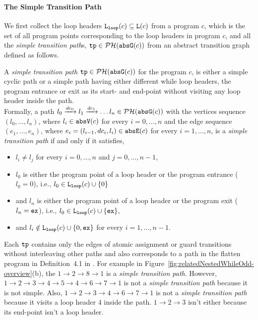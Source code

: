 \paragraph{The Simple Transition Path}
We first collect the loop headers $\mathtt{L}_{\mathtt{loop}}(c) \subseteq \mathtt{L}(c)$ from a program $c$, which is the set of all program points corresponding to the loop headers in program $c$,
and all the \emph{simple transition path}s, $\mathtt{tp} \in \mathcal{PH}(\mathtt{abs}{\mathtt{G}}(c))$ from an abstract transition graph defined as follows.
\begin{defn}
  \label{def:tpath}
A \emph{simple transition path}
$\mathtt{tp} \in \mathcal{PH}(\mathtt{abs}{\mathtt{G}}(c))$ for the program $c$, is either a simple cyclic path
or a simple path having either different while loop headers, the program entrance or exit as its start- and end-point
without visiting any loop header inside the path.
\\
Formally, a path $l_0 \xrightarrow{dc_0} l_1 \xrightarrow{dc_1} \ldots l_n \in \mathcal{PH}(\mathtt{abs}{\mathtt{G}}(c))$ with the
vertices sequence $(l_0, \ldots, l_n)$, where $l_i \in \mathtt{abs}{\mathtt{V}}(c)$ for every $i = 0, \ldots, n$ and
%
the edge sequence $(e_1, \ldots, e_n)$, where $e_i = (l_{i - 1}, dc_i, l_{i}) \in \mathtt{abs}{\mathtt{E}}(c)$ for every $i = 1, \ldots, n$,
%
is a \emph{simple transition path} if and only if it satisfies,
\begin{itemize}
  \item $l_i \neq l_j$ for every $i = 0, \ldots, n$ and $j = 0, \ldots, {n - 1}$,
  \item $l_0$ is either the program point of a loop header or the program entrance ($l_0 = 0$),
  i.e., $l_0 \in \mathtt{L}_{\mathtt{loop}}(c) \cup \{ 0 \}$
  \item and $l_n$ is either the program point of a loop header or the program exit ($l_n = \mathtt{ex}$),
  i.e., $l_0 \in \mathtt{L}_{\mathtt{loop}}(c) \cup \{ \mathtt{ex} \}$,
  \item and $l_i \notin \mathtt{L}_{\mathtt{loop}}(c) \cup \{ 0, \mathtt{ex} \}$ for every $i = 1, \ldots, n-1$.
\end{itemize}
\end{defn}
Each $\mathtt{tp}$ 
contains only the edges of atomic assignment or guard transitions without interleaving other paths and also corresponds to a path in the flatten program in Definition~4.1 in \cite{GulwaniJK09}.
For example in Figure~\ref{fig:relatedNestedWhileOdd-overview}(b), the $1 \to 2 \to 8 \to 1$ is a \emph{simple transition path}.
However, $1 \to 2 \to 3 \to 4 \to 5 \to 4 \to 6 \to 7 \to 1$ is not a \emph{simple transition path} because it is not simple.
Also, $1 \to 2 \to 3 \to 4 \to 6 \to 7 \to 1$ is not a \emph{simple transition path} because it visits a loop header $4$ inside the path. $1 \to 2 \to 3$ isn't either because its end-point isn't a loop header.


